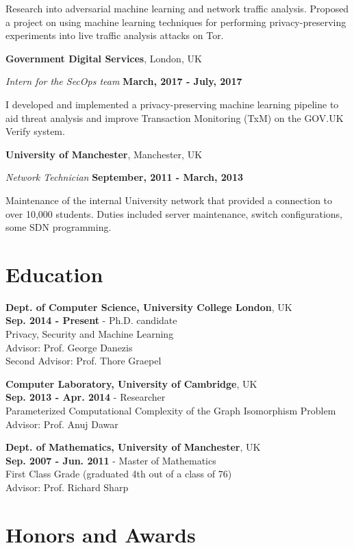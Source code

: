 \documentclass[margin,line]{res}
\begin{document}
\begin{resume}
Research into adversarial machine learning and network traffic analysis. Proposed a project on using machine learning
techniques for performing privacy-preserving experiments into live traffic analysis attacks on Tor.

{\bf Government Digital Services}, London, UK

\vspace{-.3cm}
{\em Intern for the SecOps team} \hfill {\bf March,
  2017 - July, 2017}

I developed and implemented a privacy-preserving machine learning pipeline to aid threat analysis
and improve Transaction Monitoring (TxM) on the GOV.UK Verify system.

{\bf University of Manchester}, Manchester, UK

\vspace{-.3cm}
{\em Network Technician} \hfill {\bf September, 2011 - March, 2013}

Maintenance of the internal University network that provided a
connection to over 10,000 students. Duties included server
maintenance, switch configurations, some SDN programming.


\section{\sc Education}
{\bf Dept. of Computer Science, University College London}, UK\\
{\bf Sep. 2014 - Present} - Ph.D. candidate\\
Privacy, Security and Machine Learning\\
Advisor:  Prof. George Danezis\\
Second Advisor: Prof. Thore Graepel

{\bf Computer Laboratory, University of Cambridge}, UK\\
{\bf Sep. 2013 - Apr. 2014} - Researcher\\
Parameterized Computational Complexity of the Graph Isomorphism Problem\\
Advisor: Prof. Anuj Dawar

{\bf Dept. of Mathematics, University of Manchester}, UK\\
{\bf Sep. 2007 - Jun. 2011} - Master of Mathematics\\
First Class Grade (graduated 4th out of a class of 76)\\
Advisor: Prof. Richard Sharp


\section{\sc Honors and Awards} 



\end{resume}
\end{document}
